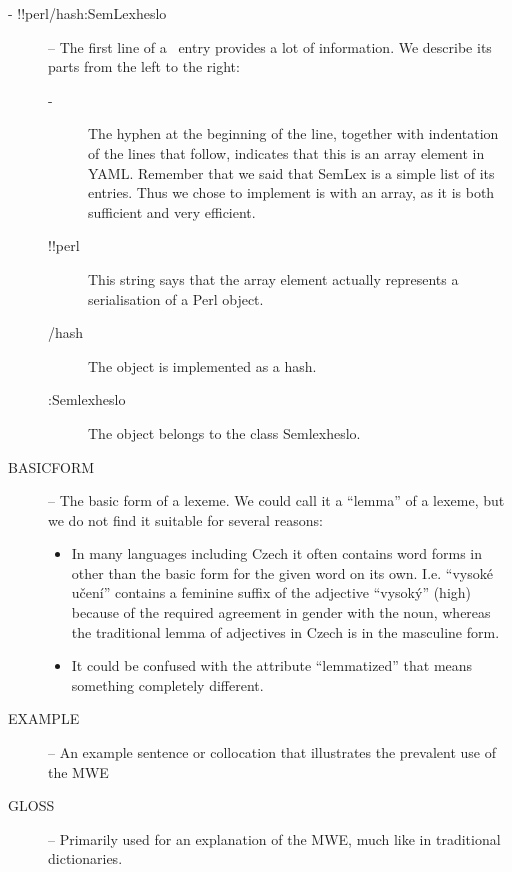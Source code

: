 \begin{description} %
\item [- !!perl/hash:SemLex\textunderscore{}heslo] -- The first line of a \semlex\ entry provides a lot of information. We describe its parts from the left to the right:
    \begin{description}
    \item [- ]The hyphen at the beginning of the line, together with indentation of the lines that follow, indicates that this is an array element in YAML. Remember that we said that SemLex is a simple list of its entries. Thus we chose to implement is with an array, as it is both sufficient and very efficient.
    \item [!!perl] This string says that the array element actually represents a serialisation of a Perl object.
    \item [/hash] The object is implemented as a hash.
    \item [:Semlex\textunderscore{}heslo] The object belongs to the class Semlex\textunderscore{}heslo.
  \end{description}
\item [BASIC\textunderscore{}FORM] -- The basic form of a lexeme. We could call it a ``lemma'' of a lexeme, but we do not find it suitable for several reasons: 
  \begin{itemize}
    \item In many languages including Czech it often contains word forms in other than the basic form for the given word on its own. I.e. ``vysoké učení'' contains a feminine suffix of the adjective ``vysoký'' (high) because of the required agreement in gender with the noun, whereas the traditional lemma of adjectives in Czech is in the masculine form.
    \item  It could be confused with the attribute ``lemmatized'' that means something completely different.
  \end{itemize}

\item [EXAMPLE] -- An example sentence or collocation that illustrates the prevalent use of the MWE

\item [GLOSS] -- Primarily used for an explanation of the MWE, much like in traditional dictionaries.


\end{description}
